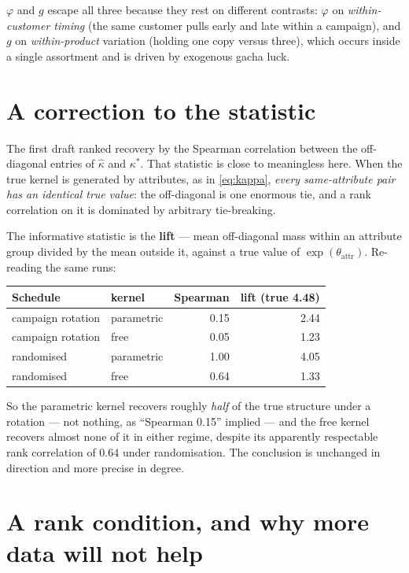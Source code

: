\documentclass[11pt]{article}
\begin{document}
\noindent $\varphi$ and $g$ escape all three because they rest on different
contrasts: $\varphi$ on \emph{within-customer timing} (the same customer pulls
early and late within a campaign), and $g$ on \emph{within-product} variation
(holding one copy versus three), which occurs inside a single assortment and is
driven by exogenous gacha luck.


\section{A correction to the statistic}\label{sec:metric}

The first draft ranked recovery by the Spearman correlation between the
off-diagonal entries of $\hat\kappa$ and $\kappa^{*}$. That statistic is close
to meaningless here. When the true kernel is generated by attributes, as in
\eqref{eq:kappa}, \emph{every same-attribute pair has an identical true value}:
the off-diagonal is one enormous tie, and a rank correlation on it is dominated
by arbitrary tie-breaking.

The informative statistic is the \textbf{lift} --- mean off-diagonal mass within
an attribute group divided by the mean outside it, against a true value of
$\exp(\theta_{\text{attr}})$. Re-reading the same runs:

\begin{center}\small
\begin{tabular}{llrr}
\toprule
Schedule & kernel & Spearman & lift (true 4.48) \\
\midrule
campaign rotation & parametric & 0.15 & 2.44 \\
campaign rotation & free & 0.05 & 1.23 \\
randomised & parametric & 1.00 & 4.05 \\
randomised & free & 0.64 & 1.33 \\
\bottomrule
\end{tabular}
\end{center}

\noindent So the parametric kernel recovers roughly \emph{half} of the true
structure under a rotation --- not nothing, as ``Spearman 0.15'' implied --- and
the free kernel recovers almost none of it in either regime, despite its
apparently respectable rank correlation of 0.64 under randomisation. The
conclusion is unchanged in direction and more precise in degree.

\section{A rank condition, and why more data will not help}\label{sec:rank}
\end{document}
